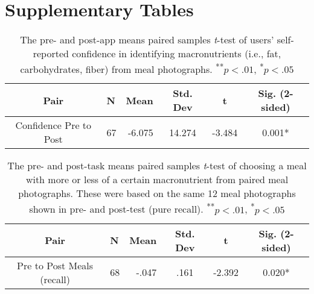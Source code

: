 \section{Supplementary Tables}


\begin{table}[!]
  \caption{The pre- and post-app means paired samples \textit{t}-test of users' self-reported confidence in identifying macronutrients (i.e., fat, carbohydrates, fiber) from meal photographs. \textsuperscript{**}$p<.01$, 
  \textsuperscript{*}$p<.05$} 
  \label{tab:confidence}
  \begin{tabular}{clrccc}
    \toprule
    Pair&N&Mean&Std. Dev&t&Sig. (2-sided)\\
    \midrule                                  
    Confidence Pre to Post  &67 &-6.075  &14.274 &-3.484   &0.001*\\
    \bottomrule
\end{tabular}
\end{table}



\begin{table}
  \caption{The pre- and post-task means paired samples \textit{t}-test of choosing a meal with more or less of a certain macronutrient from paired meal photographs. These were based on the same 12 meal photographs shown in pre- and post-test (pure recall). \textsuperscript{**}$p<.01$, 
  \textsuperscript{*}$p<.05$} 
  \label{tab:learning}
  \begin{tabular}{clrccc}
    \toprule
    Pair&N&Mean&Std. Dev&t&Sig. (2-sided)\\
    \midrule                                  
    Pre to Post Meals (recall)  &68 &-.047  &.161 &-2.392   &0.020*\\
    \bottomrule
\end{tabular}
\end{table}



